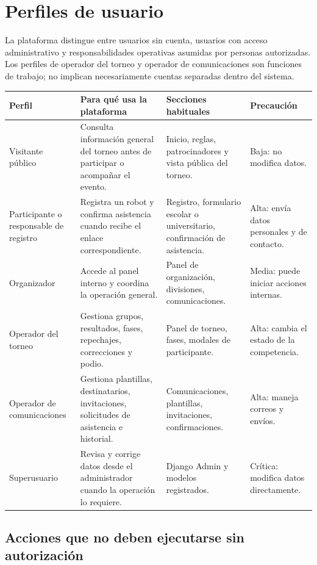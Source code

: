 \chapter*{Perfiles de usuario}

La plataforma distingue entre usuarios sin cuenta, usuarios con acceso administrativo y responsabilidades operativas asumidas por personas autorizadas. Los perfiles de operador del torneo y operador de comunicaciones son funciones de trabajo; no implican necesariamente cuentas separadas dentro del sistema.

\begin{tabularx}{\linewidth}{>{\raggedright\arraybackslash}p{2.8cm}>{\raggedright\arraybackslash}X>{\raggedright\arraybackslash}X>{\raggedright\arraybackslash}p{2.5cm}}
\toprule
Perfil & Para qué usa la plataforma & Secciones habituales & Precaución\\
\midrule
Visitante público & Consulta información general del torneo antes de participar o acompañar el evento. & Inicio, reglas, patrocinadores y vista pública del torneo. & Baja: no modifica datos.\\
Participante o responsable de registro & Registra un robot y confirma asistencia cuando recibe el enlace correspondiente. & Registro, formulario escolar o universitario, confirmación de asistencia. & Alta: envía datos personales y de contacto.\\
Organizador & Accede al panel interno y coordina la operación general. & Panel de organización, divisiones, comunicaciones. & Media: puede iniciar acciones internas.\\
Operador del torneo & Gestiona grupos, resultados, fases, repechajes, correcciones y podio. & Panel de torneo, fases, modales de participante. & Alta: cambia el estado de la competencia.\\
Operador de comunicaciones & Gestiona plantillas, destinatarios, invitaciones, solicitudes de asistencia e historial. & Comunicaciones, plantillas, invitaciones, confirmaciones. & Alta: maneja correos y envíos.\\
Superusuario & Revisa y corrige datos desde el administrador cuando la operación lo requiere. & Django Admin y modelos registrados. & Crítica: modifica datos directamente.\\
\bottomrule
\end{tabularx}

\section*{Acciones que no deben ejecutarse sin autorización}


